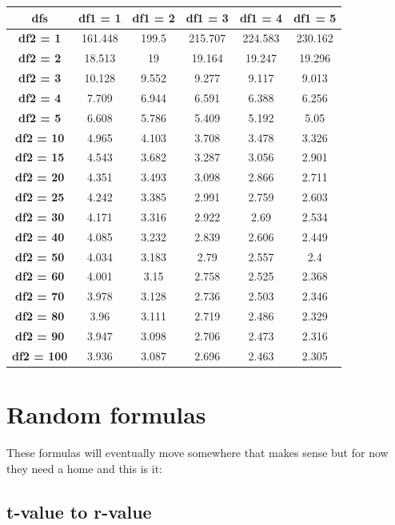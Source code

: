 \documentclass[
  oneside]{book}
\begin{document}
\begin{longtable}[]{@{}cccccc@{}}
\toprule
dfs & df1 = 1 & df1 = 2 & df1 = 3 & df1 = 4 & df1 = 5 \\
\midrule
\endhead
\textbf{df2 = 1} & 161.448 & 199.5 & 215.707 & 224.583 & 230.162 \\
\textbf{df2 = 2} & 18.513 & 19 & 19.164 & 19.247 & 19.296 \\
\textbf{df2 = 3} & 10.128 & 9.552 & 9.277 & 9.117 & 9.013 \\
\textbf{df2 = 4} & 7.709 & 6.944 & 6.591 & 6.388 & 6.256 \\
\textbf{df2 = 5} & 6.608 & 5.786 & 5.409 & 5.192 & 5.05 \\
\textbf{df2 = 10} & 4.965 & 4.103 & 3.708 & 3.478 & 3.326 \\
\textbf{df2 = 15} & 4.543 & 3.682 & 3.287 & 3.056 & 2.901 \\
\textbf{df2 = 20} & 4.351 & 3.493 & 3.098 & 2.866 & 2.711 \\
\textbf{df2 = 25} & 4.242 & 3.385 & 2.991 & 2.759 & 2.603 \\
\textbf{df2 = 30} & 4.171 & 3.316 & 2.922 & 2.69 & 2.534 \\
\textbf{df2 = 40} & 4.085 & 3.232 & 2.839 & 2.606 & 2.449 \\
\textbf{df2 = 50} & 4.034 & 3.183 & 2.79 & 2.557 & 2.4 \\
\textbf{df2 = 60} & 4.001 & 3.15 & 2.758 & 2.525 & 2.368 \\
\textbf{df2 = 70} & 3.978 & 3.128 & 2.736 & 2.503 & 2.346 \\
\textbf{df2 = 80} & 3.96 & 3.111 & 2.719 & 2.486 & 2.329 \\
\textbf{df2 = 90} & 3.947 & 3.098 & 2.706 & 2.473 & 2.316 \\
\textbf{df2 = 100} & 3.936 & 3.087 & 2.696 & 2.463 & 2.305 \\
\bottomrule
\end{longtable}

\hypertarget{random-formulas}{%
\chapter{Random formulas}\label{random-formulas}}

These formulas will eventually move somewhere that makes sense but for now they need a home and this is it:

\hypertarget{t-value-to-r-value}{%
\section{t-value to r-value}\label{t-value-to-r-value}}
\end{document}
